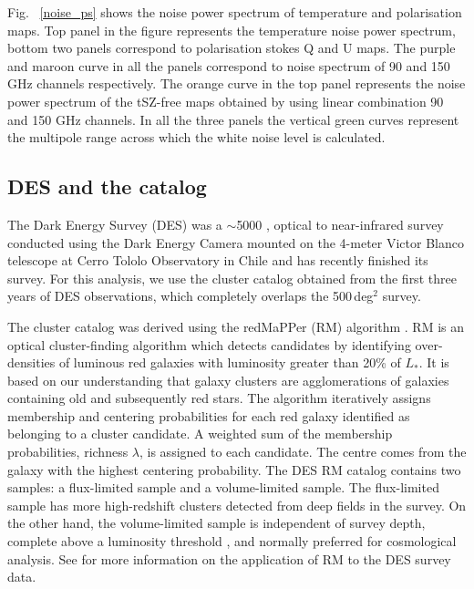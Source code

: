 Fig. ~\ref{noise_ps} shows the noise power spectrum of temperature and polarisation maps. 
Top panel in the figure represents the temperature noise power spectrum, bottom two panels correspond to polarisation stokes Q and U maps. 
The purple and maroon curve in all the panels correspond to noise spectrum of 90 and 150 GHz channels respectively.
The orange curve in the top panel represents the noise power spectrum of the tSZ-free maps obtained by using linear combination 90 and 150 GHz channels. 
In all the three panels the vertical green curves represent the multipole range across which the white noise level is calculated.


\subsection{DES and the {\rm \RM} catalog}\label{sec_DES}
The Dark Energy Survey (DES) was a $\sim$5000 \sqdeg, optical to near-infrared survey conducted using the Dark Energy Camera \citep{flaugher15} mounted on the 4-meter Victor Blanco telescope at Cerro Tololo Observatory in Chile and has recently finished its survey. 
For this analysis, we use the cluster catalog obtained from the first three years of DES observations, which completely overlaps the \sptpol{} 500\,deg$^{2}$ survey. 

The cluster catalog was derived using the redMaPPer (RM) algorithm \citep{rykoff14}.
RM is an optical cluster-finding algorithm which detects candidates by identifying over-densities of luminous red galaxies with luminosity greater than 20\% of $L_{*}.$
It is based on our understanding that galaxy clusters are agglomerations of galaxies containing old and subsequently red stars. 
The algorithm iteratively assigns membership and centering probabilities for each red galaxy identified as belonging to a cluster candidate. 
A weighted sum of the membership probabilities, richness $\lambda$, is assigned to each candidate.
The centre comes from the galaxy with the highest centering probability.
The DES RM catalog contains two samples: a flux-limited sample and a volume-limited sample. 
The flux-limited sample has more high-redshift clusters detected from deep fields in the survey. 
On the other hand, the volume-limited sample is independent of survey depth, complete above a luminosity threshold \citep{mcclintock18}, and normally preferred for cosmological analysis.
See \citet{rykoff16} for more information on the application of RM to the DES survey data.

